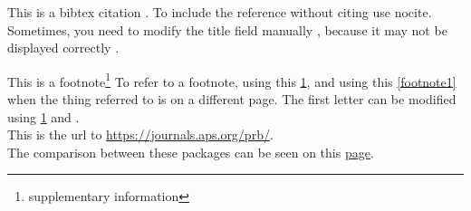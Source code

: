 \documentclass{article}
\begin{document}
This is a bibtex citation \cite{PhysRevB.78.104104}.
To include the reference without citing use nocite. \nocite{PhysRevLett.99.077601}
Sometimes, you need to modify the title field manually \cite{PhysRevB.82.134106_original}, because it may not be displayed correctly \cite{PhysRevB.82.134106_modified}. 

This is a footnote\footnote{\label{footnote1}supplementary information}
\newpage
To refer to a footnote, using this \ref{footnote1}, and using this \vref{footnote1} when the thing referred to is on a different page. The first letter can be modified using \cref{footnote1} and . \\
This is the url to \url{https://journals.aps.org/prb/}. \\
The comparison between these packages can be seen on this \href{https://tex.stackexchange.com/questions/83037/difference-between-ref-varioref-and-cleveref-decision-for-a-thesis}{page}.


% 
% 
\end{document}
